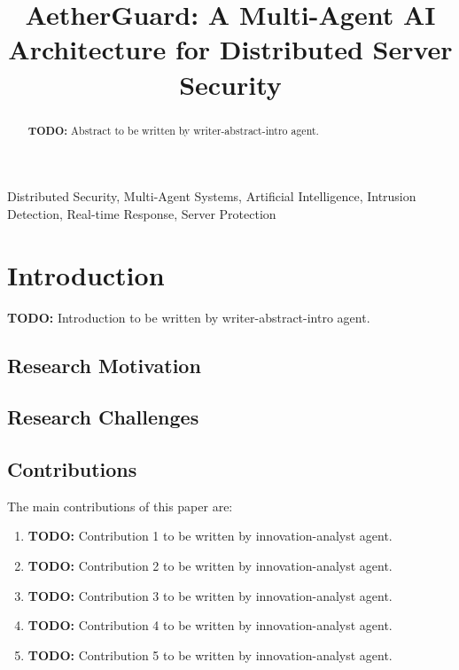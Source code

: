 \documentclass[10pt,journal,compsoc]{IEEEtran}
\newcommand{\systemname}{AetherGuard}
\begin{document}
\title{\systemname: A Multi-Agent AI Architecture for Distributed Server Security}

\author{
}

\maketitle

\begin{abstract}
\textbf{TODO:} Abstract to be written by writer-abstract-intro agent.
\end{abstract}

\begin{IEEEkeywords}
Distributed Security, Multi-Agent Systems, Artificial Intelligence, Intrusion Detection, Real-time Response, Server Protection
\end{IEEEkeywords}

\section{Introduction}
\label{sec:introduction}
\textbf{TODO:} Introduction to be written by writer-abstract-intro agent.

\subsection{Research Motivation}
\label{subsec:motivation}

\subsection{Research Challenges}
\label{subsec:challenges}

\subsection{Contributions}
\label{subsec:contributions}
The main contributions of this paper are:
\begin{enumerate}
    \item \textbf{TODO:} Contribution 1 to be written by innovation-analyst agent.
    \item \textbf{TODO:} Contribution 2 to be written by innovation-analyst agent.
    \item \textbf{TODO:} Contribution 3 to be written by innovation-analyst agent.
    \item \textbf{TODO:} Contribution 4 to be written by innovation-analyst agent.
    \item \textbf{TODO:} Contribution 5 to be written by innovation-analyst agent.
\end{enumerate}
\end{document}

